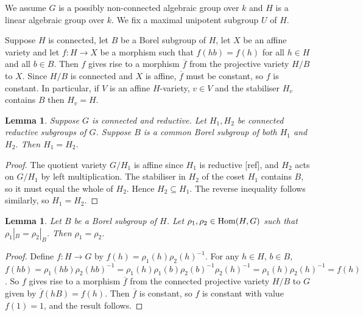 \documentclass[12pt]{amsart}
\newcommand\ra{\rightarrow}
\numberwithin{equation}{section}
\newtheorem{lem}[equation]{Lemma}
\theoremstyle{definition}
\theoremstyle{remark}
\theoremstyle{remark}
\newcommand{\ovl}{\overline}
\begin{document}
We assume $G$ is a possibly non-connected algebraic group over $k$ and $H$ is a linear algebraic group over $k$.  We fix a maximal unipotent subgroup $U$ of $H$.


Suppose $H$ is connected, let $B$ be a Borel subgroup of $H$, let $X$ be an affine variety and let $f\colon H\ra X$ be a morphism such that $f(hb)= f(h)$ for all $h\in H$ and all $b\in B$.  Then $f$ gives rise to a morphism $\ovl{f}$ from the projective variety $H/B$ to $X$.  Since $H/B$ is connected and $X$ is affine, $\ovl{f}$ must be constant, so $f$ is constant.  In particular, if $V$ is an affine $H$-variety, $v\in V$ and the stabiliser $H_v$ contains $B$ then $H_v= H$.

\begin{lem}
\label{lem:common_Borel}
 Suppose $G$ is connected and reductive.  Let $H_1, H_2$ be connected reductive subgroups of $G$.  Suppose $B$ is a common Borel subgroup of both $H_1$ and $H_2$.  Then $H_1= H_2$.
\end{lem}

\begin{proof}
 The quotient variety $G/H_1$ is affine since $H_1$ is reductive [ref], and $H_2$ acts on $G/H_1$ by left multiplication.  The stabiliser in $H_2$ of the coset $H_1$ contains $B$, so it must equal the whole of $H_2$.  Hence $H_2\subseteq H_1$.  The reverse inequality follows similarly, so $H_1= H_2$.
\end{proof}

\begin{lem}
\label{lem:Borel_det}
 Let $B$ be a Borel subgroup of $H$.  Let $\rho_1,\rho_2\in {\rm Hom}(H,G)$ such that $\rho_1|_B= \rho_2|_B$.  Then $\rho_1= \rho_2$.
\end{lem}

\begin{proof}
 Define $f\colon H\ra G$ by $f(h)= \rho_1(h)\rho_2(h)^{-1}$.  For any $h\in H$, $b\in B$, $f(hb)= \rho_1(hb)\rho_2(hb)^{-1}= \rho_1(h)\rho_1(b)\rho_2(b)^{-1}\rho_2(h)^{-1}=  \rho_1(h)\rho_2(h)^{-1}= f(h)$.  So $f$ gives rise to a morphism $\ovl{f}$ from the connected projective variety $H/B$ to $G$ given by $\ovl{f}(hB)= f(h)$.  Then $\ovl{f}$ is constant, so $f$ is constant with value $f(1)= 1$, and the result follows.
\end{proof}
\end{document}
